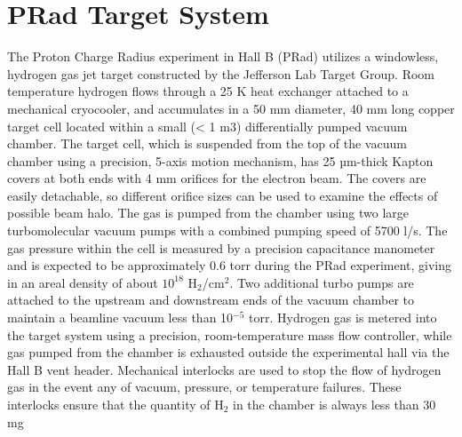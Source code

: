 \section{PRad Target System}

The Proton Charge Radius experiment in Hall B (PRad) utilizes a windowless, hydrogen gas jet target constructed by the Jefferson Lab Target Group. Room temperature
hydrogen flows through a 25 K heat exchanger attached to a mechanical cryocooler, and
accumulates in a 50 mm diameter, 40 mm long copper target cell located within a small
(< 1 m3) differentially pumped vacuum chamber. The target cell, which is suspended
from the top of the vacuum chamber using a precision, 5-axis motion mechanism, has
25 µm-thick Kapton covers at both ends with 4 mm orifices for the electron beam. The
covers are easily detachable, so different orifice sizes can be used to examine the effects of
possible beam halo. The gas is pumped from the chamber using two large turbomolecular
vacuum pumps with a combined pumping speed of 5700 l/s. The gas pressure within
the cell is measured by a precision capacitance manometer and is expected to be approximately 0.6 torr 
during the PRad experiment, giving in an areal density of about $10^{18}$ H$_2$/cm$^2$. 
Two additional turbo pumps are attached to the upstream and downstream 
ends of the vacuum chamber to maintain a beamline vacuum less than 10$^{-5}$ torr.
Hydrogen gas is metered into the target system using a precision, room-temperature
mass flow controller, while gas pumped from the chamber is exhausted outside the experimental hall via the Hall B vent header. Mechanical interlocks are used to stop the flow
of hydrogen gas in the event any of vacuum, pressure, or temperature failures. These
interlocks ensure that the quantity of H$_2$ in the chamber is always less than 30 mg

